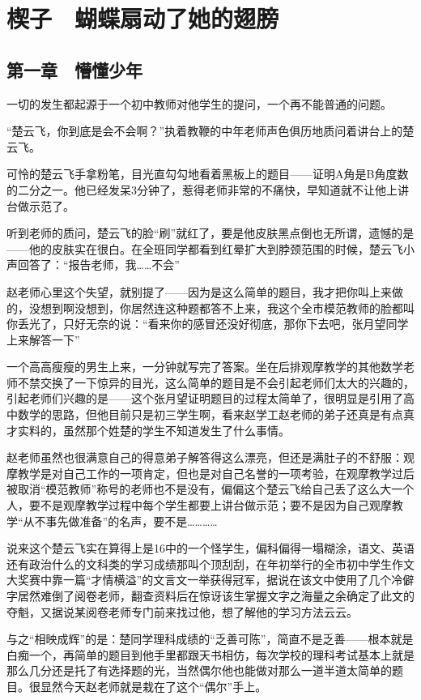\chapter{楔子　蝴蝶扇动了她的翅膀}

\section{第一章　懵懂少年}

一切的发生都起源于一个初中教师对他学生的提问，一个再不能普通的问题。

“楚云飞，你到底是会不会啊？”执着教鞭的中年老师声色俱历地质问着讲台上的楚云飞。

可怜的楚云飞手拿粉笔，目光直勾勾地看着黑板上的题目——证明A角是B角度数的二分之一。他已经发呆3分钟了，惹得老师非常的不痛快，早知道就不让他上讲台做示范了。

听到老师的质问，楚云飞的脸“刷”就红了，要是他皮肤黑点倒也无所谓，遗憾的是——他的皮肤实在很白。在全班同学都看到红晕扩大到脖颈范围的时候，楚云飞小声回答了：“报告老师，我……不会”

赵老师心里这个失望，就别提了——因为是这么简单的题目，我才把你叫上来做的，没想到啊没想到，你居然连这种题都答不上来，我这个全市模范教师的脸都叫你丢光了，只好无奈的说：“看来你的感冒还没好彻底，那你下去吧，张月望同学上来解答一下”

一个高高瘦瘦的男生上来，一分钟就写完了答案。坐在后排观摩教学的其他数学老师不禁交换了一下惊异的目光，这么简单的题目是不会引起老师们太大的兴趣的，引起老师们兴趣的是——这个张月望证明题目的过程太简单了，很明显是引用了高中数学的思路，但他目前只是初三学生啊，看来赵学工赵老师的弟子还真是有点真才实料的，虽然那个姓楚的学生不知道发生了什么事情。

赵老师虽然也很满意自己的得意弟子解答得这么漂亮，但还是满肚子的不舒服：观摩教学是对自己工作的一项肯定，但也是对自己名誉的一项考验，在观摩教学过后被取消“模范教师”称号的老师也不是没有，偏偏这个楚云飞给自己丢了这么大一个人，要不是观摩教学过程中每个学生都要上讲台做示范；要不是因为自己观摩教学“从不事先做准备”的名声，要不是…………

说来这个楚云飞实在算得上是16中的一个怪学生，偏科偏得一塌糊涂，语文、英语还有政治什么的文科类的学习成绩那叫个顶刮刮，在年初举行的全市初中学生作文大奖赛中靠一篇“才情横溢”的文言文一举获得冠军，据说在该文中使用了几个冷僻字居然难倒了阅卷老师，翻查资料后在惊讶该生掌握文字之海量之余确定了此文的夺魁，又据说某阅卷老师专门前来找过他，想了解他的学习方法云云。

与之“相映成辉”的是：楚同学理科成绩的“乏善可陈”，简直不是乏善——根本就是白痴一个，再简单的题目到他手里都跟天书相仿，每次学校的理科考试基本上就是那么几分还是托了有选择题的光，当然偶尔他也能做对那么一道半道太简单的题目。很显然今天赵老师就是栽在了这个“偶尔”手上。

